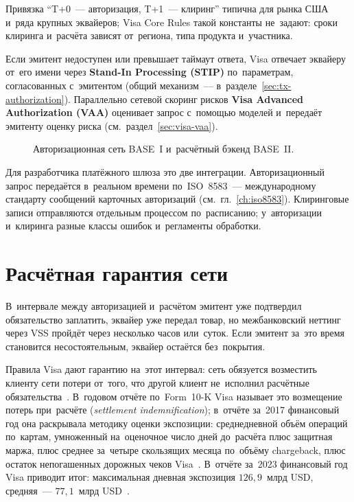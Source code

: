 Привязка \enquote{T+0~--- авторизация, T+1~--- клиринг} типична для рынка США
и~ряда крупных эквайеров; Visa Core Rules такой константы не~задают: сроки
клиринга и~расчёта зависят от~региона, типа продукта и~участника.

Если эмитент недоступен или превышает таймаут ответа, Visa отвечает эквайеру
от~его имени через \textbf{Stand-In Processing (STIP)} по~параметрам,
согласованных с~эмитентом (общий механизм~---
в~разделе~\ref{sec:tx-authorization}). Параллельно сетевой скоринг рисков
\textbf{Visa Advanced Authorization (VAA)} оценивает запрос с~помощью моделей
и~передаёт эмитенту оценку риска (см.~раздел~\ref{sec:visa-vaa}).

\begin{figure}[!ht]
  \centering
  \caption{Авторизационная сеть BASE~I и~расчётный бэкенд BASE~II.}\label{fig:visanet-base-i-ii}
\end{figure}

Для разработчика платёжного шлюза это две интеграции. Авторизационный запрос
передаётся в~реальном времени по~ISO~8583~--- международному стандарту
сообщений карточных авторизаций (см.~гл.~\ref{ch:iso8583}). Клиринговые записи
отправляются отдельным процессом по~расписанию; у~авторизации и~клиринга разные
классы ошибок и~регламенты обработки.

\section{Расчётная гарантия сети}\label{sec:visa-settlement-guarantee}

В~интервале между авторизацией и~расчётом эмитент уже подтвердил обязательство
заплатить, эквайер уже передал товар, но межбанковский неттинг через VSS
пройдёт через несколько часов или~суток. Если эмитент за~это время становится
несостоятельным, эквайер остаётся без~покрытия.

Правила Visa дают гарантию на~этот интервал: сеть обязуется возместить
клиенту сети потери от~того, что другой клиент не~исполнил
расчётные обязательства~\cite{visa-10k-settlement-guarantee-fy2023}.
В~годовом отчёте
по~Form~10-K Visa называет это возмещение потерь при~расчёте
(\textit{settlement indemnification}); в~отчёте за~2017 финансовый год она
раскрывала методику оценки экспозиции: среднедневной объём операций по~картам,
умноженный на~оценочное число дней до~расчёта плюс защитная маржа, плюс
среднее за~четыре скользящих месяца по~объёму chargeback, плюс остаток
непогашенных дорожных чеков Visa~\cite{visa-10k-fy2017}. В~отчёте за~2023
финансовый год Visa приводит итог: максимальная дневная экспозиция
$126{,}9$~млрд USD, средняя~--- $77{,}1$~млрд USD~\cite{visa-10k-settlement-guarantee-fy2023}.


